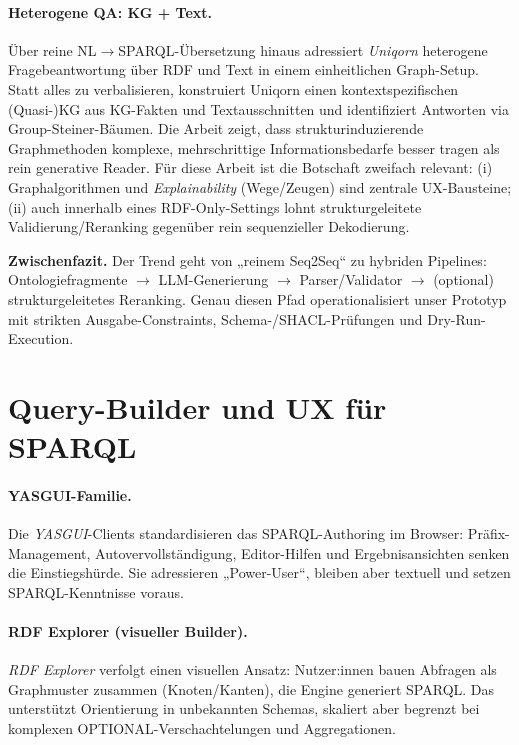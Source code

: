 \paragraph{Heterogene QA: KG + Text.}
Über reine NL$\rightarrow$SPARQL-Übersetzung hinaus adressiert \emph{Uniqorn} heterogene Fragebeantwortung über RDF und Text in einem einheitlichen Graph-Setup. Statt alles zu verbalisieren, konstruiert Uniqorn einen kontextspezifischen (Quasi-)KG aus KG-Fakten und Textausschnitten und identifiziert Antworten via Group-Steiner-Bäumen. Die Arbeit zeigt, dass strukturinduzierende Graphmethoden komplexe, mehrschrittige Informationsbedarfe besser tragen als rein generative Reader. Für diese Arbeit ist die Botschaft zweifach relevant: (i) Graphalgorithmen und \emph{Explainability} (Wege/Zeugen) sind zentrale UX-Bausteine; (ii) auch innerhalb eines RDF-Only-Settings lohnt strukturgeleitete Validierung/Reranking gegenüber rein sequenzieller Dekodierung.

\medskip
\noindent\textbf{Zwischenfazit.} Der Trend geht von „reinem Seq2Seq“ zu hybriden Pipelines: Ontologiefragmente $\rightarrow$ LLM-Generierung $\rightarrow$ Parser/Validator $\rightarrow$ (optional) strukturgeleitetes Reranking. Genau diesen Pfad operationalisiert unser Prototyp mit strikten Ausgabe-Constraints, Schema-/SHACL-Prüfungen und Dry-Run-Execution.

\section{Query-Builder und UX für SPARQL}
\label{sec:rw-querybuilder}

\paragraph{YASGUI-Familie.}
Die \emph{YASGUI}-Clients standardisieren das SPARQL-Authoring im Browser: Präfix-Management, Autovervollständigung, Editor-Hilfen und Ergebnisansichten senken die Einstiegshürde. Sie adressieren „Power-User“, bleiben aber textuell und setzen SPARQL-Kenntnisse voraus.

\paragraph{RDF Explorer (visueller Builder).}
\emph{RDF Explorer} verfolgt einen visuellen Ansatz: Nutzer:innen bauen Abfragen als Graphmuster zusammen (Knoten/Kanten), die Engine generiert SPARQL. Das unterstützt Orientierung in unbekannten Schemas, skaliert aber begrenzt bei komplexen OPTIONAL-Verschachtelungen und Aggregationen.

